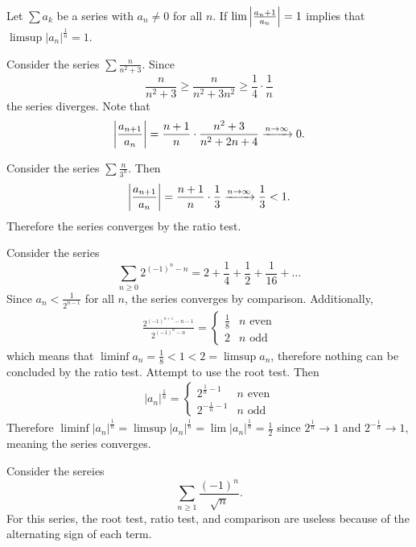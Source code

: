 \documentclass[../notes.tex]{subfiles}
\begin{document}
\begin{remark}
    Let $\sum a_k$ be a series with $a_n \neq 0$ for all $n$. If $\lim \qty|\frac{a_n+1}{a_n}| = 1$ implies that $\limsup |a_n|^{\frac{1}{n}} = 1$.
\end{remark}

\begin{example}
    Consider the series $\sum \frac{n}{n^2 + 3}$. Since
    \[
        \frac{n}{n^2 + 3} \geq \frac{n}{n^2 + 3n^2} \geq \frac{1}{4} \cdot \frac{1}{n}
    \]
    the series diverges. Note that
    \[
        \qty|\frac{a_{n+1}}{a_n}| = \frac{n+1}{n} \cdot \frac{n^2 + 3}{n^2 + 2n + 4} \xrightarrow{n \to \infty} 0
    .\]
\end{example}

\begin{example}
    Consider the series $\sum \frac{n}{3^n}$. Then
    \[
        \qty|\frac{a_{n+1}}{a_n}| = \frac{n+1}{n} \cdot \frac{1}{3} \xrightarrow{n \to \infty} \frac{1}{3} < 1
    .\]
    Therefore the series converges by the ratio test.
\end{example}

\begin{example}
    Consider the series
    \[
        \sum_{n \geq 0} 2^{(-1)^n - n} = 2 + \frac{1}{4} + \frac{1}{2} + \frac{1}{16} + \ldots
    \]
    Since $a_n < \frac{1}{2^{n-1}}$ for all $n$, the series converges by comparison. Additionally,
    \begin{align*}
        \frac{2^{(-1)^{n+1} - n - 1}}{2^{(-1)^n - n}} = \begin{cases}
            \frac{1}{8} & n \text{ even} \\
            2 & n \text{ odd}
        \end{cases}
    \end{align*}
    which means that $\liminf a_n = \frac{1}{8} < 1 < 2 = \limsup a_n$, therefore nothing can be concluded by the ratio test. Attempt to use the root test. Then
    \begin{align*}
        |a_n|^{\frac{1}{n}} = \begin{cases}
            2^{\frac{1}{n} - 1} & n \text{ even} \\
            2^{-\frac{1}{n} - 1} & n \text{ odd}
        \end{cases}
    \end{align*}
    Therefore $\liminf |a_n|^{\frac{1}{n}} = \limsup |a_n|^{\frac{1}{n}} = \lim |a_n|^{\frac{1}{n}} = \frac{1}{2}$ since $2^{\frac{1}{n}} \to 1$ and $2^{-\frac{1}{n}} \to 1$, meaning the series converges.
\end{example}

\begin{example}
    Consider the sereies
    \[
        \sum_{n \geq 1} \frac{(-1)^n}{\sqrt{n}}
    .\]
    For this series, the root test, ratio test, and comparison are useless because of the alternating sign of each term.
\end{example}
\end{document}
